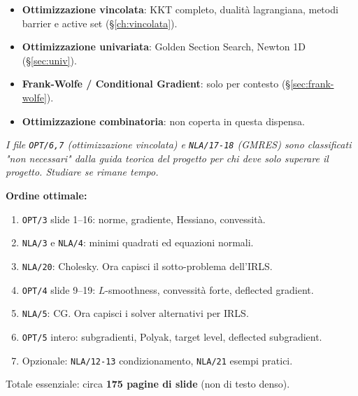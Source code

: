 \documentclass[11pt, a4paper, twoside]{book}
\theoremstyle{definition}
\theoremstyle{plain}
\theoremstyle{remark}
\begin{document}
\begin{tcolorbox}[enhanced, colback=gray!8, colframe=gray!50,
  title={\textbf{Livello 6 — Distante dal progetto (copertura di completezza)}},
  fonttitle=\bfseries, breakable]
\begin{itemize}
  \item \textbf{Ottimizzazione vincolata}: KKT completo, dualità lagrangiana, metodi barrier e active set (\S\ref{ch:vincolata}).
  \item \textbf{Ottimizzazione univariata}: Golden Section Search, Newton 1D (\S\ref{sec:univ}).
  \item \textbf{Frank-Wolfe / Conditional Gradient}: solo per contesto (\S\ref{sec:frank-wolfe}).
  \item \textbf{Ottimizzazione combinatoria}: non coperta in questa dispensa.
\end{itemize}
\textit{I file \texttt{OPT/6,7} (ottimizzazione vincolata) e \texttt{NLA/17-18} (GMRES) sono classificati
"non necessari" dalla guida teorica del progetto per chi deve solo superare il progetto. Studiare
se rimane tempo.}
\end{tcolorbox}

\vspace{0.5em}
\begin{keybox}
\textbf{Ordine ottimale:}
\begin{enumerate}
  \item \texttt{OPT/3} slide 1–16: norme, gradiente, Hessiano, convessità.
  \item \texttt{NLA/3} e \texttt{NLA/4}: minimi quadrati ed equazioni normali.
  \item \texttt{NLA/20}: Cholesky. Ora capisci il sotto-problema dell'IRLS.
  \item \texttt{OPT/4} slide 9–19: $L$-smoothness, convessità forte, deflected gradient.
  \item \texttt{NLA/5}: CG. Ora capisci i solver alternativi per IRLS.
  \item \texttt{OPT/5} intero: subgradienti, Polyak, target level, deflected subgradient.
  \item Opzionale: \texttt{NLA/12-13} condizionamento, \texttt{NLA/21} esempi pratici.
\end{enumerate}
Totale essenziale: circa \textbf{175 pagine di slide} (non di testo denso).
\end{keybox}

\end{document}

